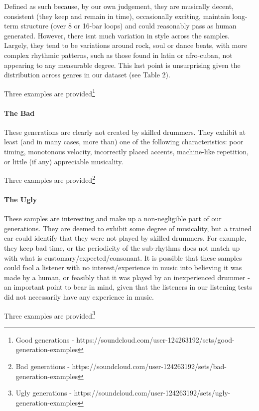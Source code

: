 \documentclass[sigconf]{nimeart}
\begin{document}
Defined as such because, by our own judgement, they are musically decent, consistent (they keep and remain in time), occasionally exciting, maintain long-term structure (over 8 or 16-bar loops) and could reasonably pass as human generated. However, there isn\textquotesingle t much variation in style across the samples. Largely, they tend to be variations around rock, soul or dance beats, with more complex rhythmic patterns, such as those found in latin or afro-cuban, not appearing to any measurable degree. This last point is unsurprising given the distribution across genres in our dataset (see Table 2).

Three examples are provided\footnote{Good generations - https://soundcloud.com/user-124263192/sets/good-generation-examples}

\paragraph{The Bad}\label{the-bad}

These generations are clearly not created by skilled drummers. They exhibit at least (and in many cases, more than) one of the following characteristics: poor timing, monotonous velocity, incorrectly placed accents, machine-like repetition, or little (if any) appreciable musicality.

Three examples are provided\footnote{Bad generations - https://soundcloud.com/user-124263192/sets/bad-generation-examples}

\paragraph{The Ugly}\label{the-ugly}

These samples are interesting and make up a non-negligible part of our generations. They are deemed to exhibit some degree of musicality, but a trained ear could identify that they were not played by skilled drummers. For example, they keep bad time, or the periodicity of the sub-rhythms does not match up with what is customary/expected/consonant. It is possible that these samples could fool a listener with no interest/experience in music into believing it was made by a human, or feasibly that it was played by an inexperienced drummer - an important point to bear in mind, given that the listeners in our listening tests did not necessarily have any experience in music.

Three examples are provided\footnote{Ugly generations - https://soundcloud.com/user-124263192/sets/ugly-generation-examples}
\end{document}
